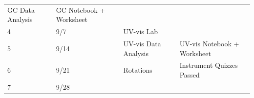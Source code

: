 \documentclass[]{tufte-book}
\begin{document}
\begin{longtable}[]{@{}llll@{}}
\begin{minipage}[t]{0.32\columnwidth}
GC Data Analysis\strut
\end{minipage} & \begin{minipage}[t]{0.40\columnwidth}\raggedright
GC Notebook + Worksheet\strut
\end{minipage}\tabularnewline
\begin{minipage}[t]{0.04\columnwidth}\raggedright
4\strut
\end{minipage} & \begin{minipage}[t]{0.13\columnwidth}\raggedright
9/7\strut
\end{minipage} & \begin{minipage}[t]{0.32\columnwidth}\raggedright
UV-vis Lab\strut
\end{minipage} & \begin{minipage}[t]{0.40\columnwidth}\raggedright
\strut
\end{minipage}\tabularnewline
\begin{minipage}[t]{0.04\columnwidth}\raggedright
5\strut
\end{minipage} & \begin{minipage}[t]{0.13\columnwidth}\raggedright
9/14\strut
\end{minipage} & \begin{minipage}[t]{0.32\columnwidth}\raggedright
UV-vis Data Analysis\strut
\end{minipage} & \begin{minipage}[t]{0.40\columnwidth}\raggedright
UV-vis Notebook + Worksheet\strut
\end{minipage}\tabularnewline
\begin{minipage}[t]{0.04\columnwidth}\raggedright
6\strut
\end{minipage} & \begin{minipage}[t]{0.13\columnwidth}\raggedright
9/21\strut
\end{minipage} & \begin{minipage}[t]{0.32\columnwidth}\raggedright
Rotations\strut
\end{minipage} & \begin{minipage}[t]{0.40\columnwidth}\raggedright
Instrument Quizzes Passed\strut
\end{minipage}\tabularnewline
\begin{minipage}[t]{0.04\columnwidth}\raggedright
7\strut
\end{minipage} & \begin{minipage}[t]{0.13\columnwidth}\raggedright
9/28\strut
\end{minipage} & \begin{minipage}[t]{0.32\columnwidth}\raggedright

\end{minipage}
\end{longtable}
\end{document}
